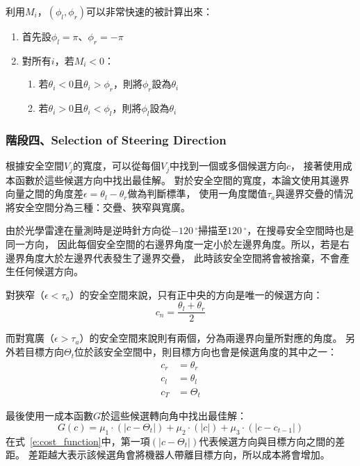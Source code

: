 利用$M_i$，$(\phi_l,\phi_r)$可以非常快速的被計算出來：
\begin{enumerate}
	\item{首先設$\phi_l = \pi$、$\phi_r = -\pi$}
	\item{對所有$i$，若$M_i < 0$：}
		\begin{enumerate}
			\item{若$\theta_i < 0$且$\theta_i > \phi_r$，則將$\phi_r$設為$\theta_i$}
			\item{若$\theta_i > 0$且$\theta_i < \phi_l$，則將$\phi_l$設為$\theta_i$}
		\end{enumerate}
\end{enumerate}

\subsubsection{階段四、Selection of Steering Direction}
根據安全空間$V_j$的寬度，可以從每個$V_j$中找到一個或多個候選方向$c$，
接著使用成本函數於這些候選方向中找出最佳解。
對於安全空間的寬度，本論文使用其邊界向量之間的角度差$\epsilon = \theta_l - \theta_r$做為判斷標準，
使用一角度閾值$\tau_a$與邊界交疊的情況將安全空間分為三種：交疊、狹窄與寬廣。

由於光學雷達在量測時是逆時針方向從$-120\,^{\circ}$掃描至$120\,^{\circ}$，在搜尋安全空間時也是同一方向，
因此每個安全空間的右邊界角度一定小於左邊界角度。所以，若是右邊界角度大於左邊界代表發生了邊界交疊，
此時該安全空間將會被捨棄，不會產生任何候選方向。

對狹窄（$\epsilon < \tau_a$）的安全空間來說，只有正中央的方向是唯一的候選方向：
\begin{equation}
	c_n = \frac{\theta_l + \theta_r}{2}
\end{equation}

而對寬廣（$\epsilon > \tau_a$）的安全空間來說則有兩個，分為兩邊界向量所對應的角度。
另外若目標方向$\Theta_t$位於該安全空間中，則目標方向也會是候選角度的其中之一：
\begin{align}
	c_r &= \theta_r \nonumber \\
	c_l &= \theta_l \nonumber \\
	c_T &= \Theta_t 
\end{align}

最後使用一成本函數$G$於這些候選轉向角中找出最佳解：
\begin{equation}
	G(c) = \mu_1\cdot(|c - \Theta_t|) + \mu_2\cdot(|c|) + \mu_3\cdot(|c - c_{t-1}|)
	\label{e:cost_function}
\end{equation}
在式~\ref{e:cost_function}中，第一項$(|c - \Theta_t|)$代表候選方向與目標方向之間的差距。
差距越大表示該候選角會將機器人帶離目標方向，所以成本將會增加。

